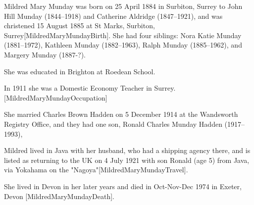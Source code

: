 Mildred Mary Munday was born on 25 April 1884 in Surbiton, Surrey to  John Hill Munday (1844--1918) and Catherine Aldridge (1847--1921), and was christened 15 August 1885 at St Marks, Surbiton, Surrey[MildredMaryMundayBirth]. She had four siblings:  Nora Katie Munday (1881--1972),  Kathleen Munday (1882--1963), Ralph Munday (1885--1962), and Margery Munday (1887-?).

She was educated in Brighton at Roedean School.

In 1911 she was a Domestic Economy Teacher in Surrey. [MildredMaryMundayOccupation]

She married Charles Brown Hadden on	5 December 1914  at the	Wandsworth Registry Office, and they had one son,  Ronald Charles Munday Hadden (1917--1993),

Mildred lived in Java with her husband, who had a shipping agency there, and is listed as returning to the UK on 4 July 1921 with son Ronald (age 5) from Java, via Yokahama on the "Nagoya"[MildredMaryMundayTravel].

She lived in Devon in her later years and died in Oct-Nov-Dec 1974 in	Exeter, Devon [MildredMaryMundayDeath].
